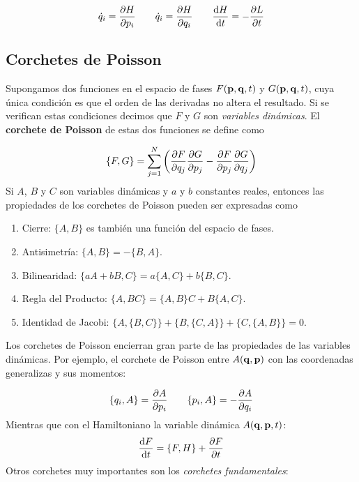 \begin{equation}
	\dot{q}_i = \frac{\partial H}{\partial p_i} \qquad \dot{q}_i = \frac{\partial H}{\partial q_i} \qquad \frac{\mathrm{d} H}{\mathrm{d} t} = - \frac{\partial L}{\partial t}
\end{equation}

\subsection{Corchetes de Poisson}

Supongamos dos funciones en el espacio de fases $F(\mathbf{p},\mathbf{q},t)$ y $G(\mathbf{p},\mathbf{q},t)$, cuya única condición es que el orden de las derivadas no altera el resultado. Si se verifican estas condiciones decimos que $F$ y $G$ son \textit{variables dinámicas}. El \textbf{corchete de Poisson} de estas dos funciones se define como

\begin{equation}
	\{ F,G \} = \sum_{j=1}^{N} \left( \frac{\partial F}{\partial q_j}\frac{\partial G}{\partial p_j} -\frac{\partial F}{\partial p_j} \frac{\partial G}{\partial q_j}      \right) 
\end{equation}
Si $A$, $B$ y $C$ son variables dinámicas y $a$ y $b$ constantes reales, entonces las propiedades de los corchetes de Poisson pueden ser expresadas como


\begin{enumerate}
	\item Cierre: $\{A,B\}$ es también una función del espacio de fases.
	\item Antisimetría:  $\{A,B\}=-\{B,A\}$.
	\item Bilinearidad: $\{aA+bB,C\}=a\{A,C\}+b\{B,C\}$.
	\item Regla del Producto: $\{A,BC\}=\{A,B\}C+B\{A,C\}$.
	\item Identidad de Jacobi: $\{A,\{B,C\}\}+\{B,\{C,A\}\}+\{C,\{A,B\}\}=0$.
\end{enumerate}
Los corchetes de Poisson encierran gran parte de las propiedades de las variables dinámicas. Por ejemplo, el corchete de Poisson entre $A(\mathbf{q},\mathbf{p})$ con las coordenadas generalizas y sus momentos:

\begin{equation}
	\{q_i,A\} = \frac{\partial A}{\partial p_i} \qquad 
	\{p_i,A\} = - \frac{\partial A}{\partial q_i}
\end{equation}
Mientras que con el Hamiltoniano la variable dinámica $A(\mathbf{q},\mathbf{p},t)$:
\begin{equation}
	 \frac{\mathrm{d} F}{\mathrm{d} t} = \{ F,H\} + \frac{\partial F}{\partial t}
\end{equation}
Otros corchetes muy importantes son los \textit{corchetes fundamentales}:

